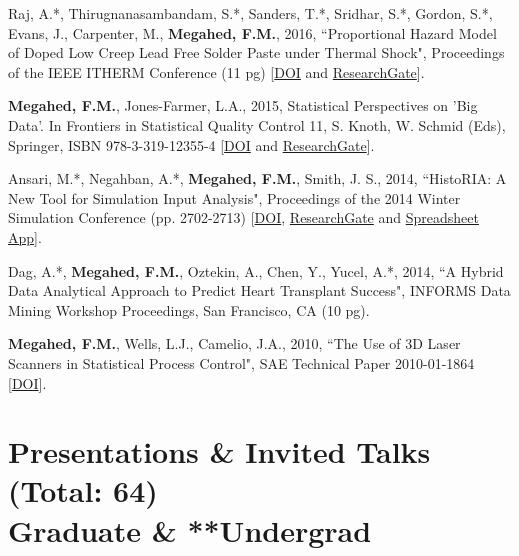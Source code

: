 \documentclass[margin,line]{res}
\begin{document}
\begin{resume}
\vspace{-1.5mm} 
Raj, A.*, Thirugnanasambandam, S.*, Sanders, T.*, Sridhar, S.*, Gordon, S.*, Evans, J., Carpenter, M.,\textbf{ Megahed, F.M.}, 2016, ``Proportional Hazard Model of Doped Low Creep Lead Free Solder Paste under Thermal Shock", Proceedings of the IEEE ITHERM Conference (11 pg) [\faFile*\href{https://doi.org/10.1109/ITHERM.2016.7517683}{DOI} and \faResearchgate \href{https://www.researchgate.net/publication/305525293_Proportional_Hazard_Model_of_doped_low_creep_lead_free_solder_paste_under_thermal_shock}{ResearchGate}].

\vspace{-1.5mm} 
\textbf{Megahed, F.M.}, Jones-Farmer, L.A., 2015, Statistical Perspectives on 'Big Data'.  In Frontiers in Statistical Quality Control 11, S. Knoth, W. Schmid (Eds), Springer, ISBN 978-3-319-12355-4 [\faFile*\href{https://doi.org/10.1007/978-3-319-12355-4_3}{DOI} and \faResearchgate \href{https://www.researchgate.net/publication/284045063_Statistical_Perspectives_on_Big_Data}{ResearchGate}].

\vspace{-1.5mm} 
Ansari, M.*, Negahban, A.*, \textbf{Megahed, F.M.}, Smith, J. S., 2014, ``HistoRIA: A New Tool for Simulation Input Analysis", Proceedings of the 2014 Winter Simulation Conference (pp. 2702-2713) [\faFile*\href{https://doi.org/10.1109/WSC.2014.7020114}{DOI}, \faResearchgate \href{https://www.researchgate.net/publication/283757185_HistoRIA_A_new_tool_for_simulation_input_analysis}{ResearchGate} and \faChartBar \href{http://jsmith.co/node/128}{Spreadsheet App}].

\vspace{-1.5mm}
Dag, A.*, \textbf{Megahed, F.M.}, Oztekin, A., Chen, Y., Yucel, A.*, 2014, ``A Hybrid Data Analytical Approach to Predict Heart Transplant Success", INFORMS Data Mining Workshop Proceedings, San Francisco, CA (10 pg).

\vspace{-1.5mm}
\textbf{Megahed, F.M.}, Wells, L.J., Camelio, J.A., 2010, ``The Use of 3D Laser Scanners in Statistical Process Control", SAE Technical Paper 2010-01-1864 [\faFile* \href{https://doi.org/10.4271/2010-01-1864}{DOI}].

\newpage  
\section{\sc Presentations \& Invited Talks \\ (Total: 64) \\ \lbrack*Graduate \& **Undergrad \rbrack}



\end{resume}
\end{document}
